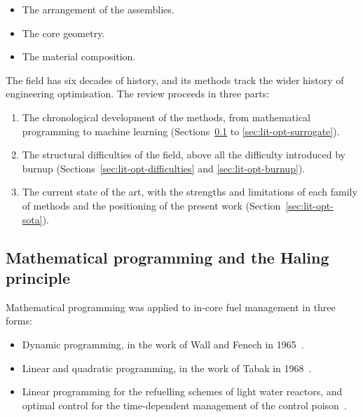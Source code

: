 \begin{itemize}
  \item The arrangement of the assemblies.

  \item The core geometry.

  \item The material composition.
\end{itemize}

The field has six decades of history, and its methods track the wider
history of engineering optimisation. The review proceeds in three
parts:

\begin{enumerate}
  \item The chronological development of the methods, from mathematical
        programming to machine learning
        (Sections~\ref{sec:lit-opt-early} to
        \ref{sec:lit-opt-surrogate}).

  \item The structural difficulties of the field, above all the
        difficulty introduced by burnup
        (Sections~\ref{sec:lit-opt-difficulties}
        and \ref{sec:lit-opt-burnup}).

  \item The current state of the art, with the strengths and
        limitations of each family of methods and the positioning of
        the present work (Section~\ref{sec:lit-opt-sota}).
\end{enumerate}

\subsection{Mathematical programming and the Haling principle}
\label{sec:lit-opt-early}

Mathematical programming was applied to in-core fuel management in
three forms:

\begin{itemize}
  \item Dynamic programming, in the work of Wall and Fenech in
        1965~\cite{meneses_2010}.

  \item Linear and quadratic programming, in the work of Tabak in
        1968~\cite{meneses_2010}.

  \item Linear programming for the refuelling schemes of light water
        reactors, and optimal control for the time-dependent management
        of the control poison~\cite{downar_1988}.
\end{itemize}

